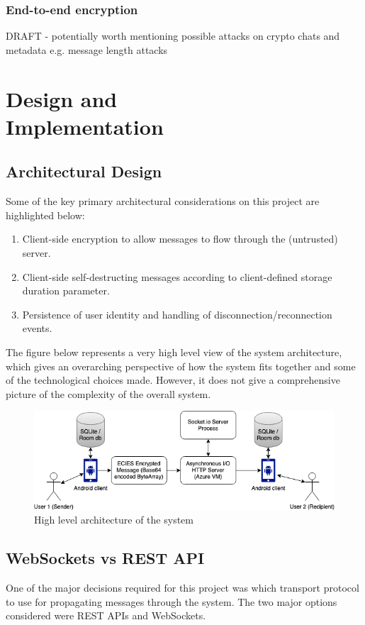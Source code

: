 \documentclass{mproj}
\begin{document}
\subsection{End-to-end encryption}

DRAFT - potentially worth mentioning possible attacks on crypto chats and metadata e.g. message length attacks \cite{degabriele2021hiding}

\chapter{Design and \\ Implementation}\label{design}
\section{Architectural Design}
Some of the key primary architectural considerations on this project are highlighted below:
\begin{enumerate}
	\item Client-side encryption to allow messages to flow through the (untrusted) server.
	\item Client-side self-destructing messages according to client-defined storage duration parameter.
	\item Persistence of user identity and handling of disconnection/reconnection events.
\end{enumerate}

The figure below represents a very high level view of the system architecture, which gives an overarching perspective of how the system fits together and some of the technological choices made. However, it does not give a comprehensive picture of the complexity of the overall system.

\begin{figure}[h!]
\includegraphics[scale=0.5]{images/high-level-architecture.png}
\caption{High level architecture of the system}
\end{figure}

\section{WebSockets vs REST API}
One of the major decisions required for this project was which transport protocol to use for propagating messages through the system. The two major options considered were REST APIs\cite{masse2011rest} and WebSockets\cite{fette2011websocket}. 
\end{document}

